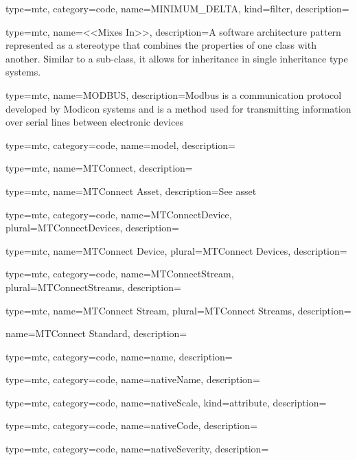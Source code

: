 {
  type=mtc,
  category=code,
  name={MINIMUM\_DELTA},
  kind={filter},
  description={}
}


{
  type=mtc,
  name={<<Mixes In>>},
  description={A software architecture pattern represented as a \gls{stereotype} that combines the properties of one class with another. Similar to a sub-class, it allows for inheritance in single inheritance type systems.}
}


{
  type=mtc,
  name=MODBUS,
  description={Modbus is a communication protocol developed by Modicon systems and is a method used for transmitting information over serial lines between electronic devices}
}


{
  type=mtc,
  category=code,
  name={model},
  description={}
}


{
  type=mtc,
  name={MTConnect},
  description={}
}


{
  type=mtc,
  name={MTConnect Asset},
  description={See \gls{asset}}
}


{
  type=mtc,
  category=code,
  name={MTConnectDevice},
  plural={MTConnectDevices},
  description={}
}


{
  type=mtc,
  name={MTConnect Device},
  plural={MTConnect Devices},
  description={}
}


{
  type=mtc,
  category=code,
  name={MTConnectStream},
  plural={MTConnectStreams},
  description={}
}


{
  type=mtc,
  name={MTConnect Stream},
  plural={MTConnect Streams},
  description={}
}


{
  name={MTConnect Standard},
  description={}
}


{
  type=mtc,
  category=code,
  name={name},
  description={}
}


{
  type=mtc,
  category=code,
  name={nativeName},
  description={}
}


{
  type=mtc,
  category=code,
  name={nativeScale},
  kind={attribute},
  description={}
}


{
  type=mtc,
  category=code,
  name={nativeCode},
  description={}
}


{
  type=mtc,
  category=code,
  name={nativeSeverity},
  description={}
}


